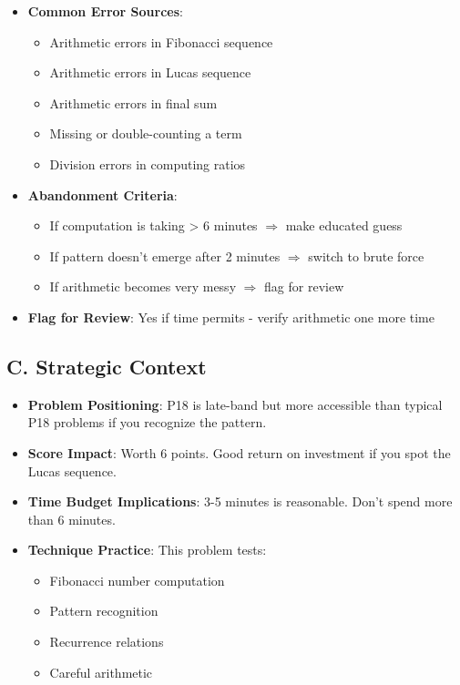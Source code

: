 \documentclass[12pt]{article}
\begin{document}
\begin{competitionbox}
\begin{itemize}[leftmargin=*]
    \item \textbf{Common Error Sources}:
    \begin{itemize}
        \item Arithmetic errors in Fibonacci sequence
        \item Arithmetic errors in Lucas sequence
        \item Arithmetic errors in final sum
        \item Missing or double-counting a term
        \item Division errors in computing ratios
    \end{itemize}
    
    \item \textbf{Abandonment Criteria}: 
    \begin{itemize}
        \item If computation is taking > 6 minutes $\Rightarrow$ make educated guess
        \item If pattern doesn't emerge after 2 minutes $\Rightarrow$ switch to brute force
        \item If arithmetic becomes very messy $\Rightarrow$ flag for review
    \end{itemize}
    
    \item \textbf{Flag for Review}: Yes if time permits - verify arithmetic one more time
\end{itemize}

\subsection*{C. Strategic Context}
\begin{itemize}[leftmargin=*]
    \item \textbf{Problem Positioning}: P18 is late-band but more accessible than typical P18 problems if you recognize the pattern.
    
    \item \textbf{Score Impact}: Worth 6 points. Good return on investment if you spot the Lucas sequence.
    
    \item \textbf{Time Budget Implications}: 3-5 minutes is reasonable. Don't spend more than 6 minutes.
    
    \item \textbf{Technique Practice}: This problem tests:
    \begin{itemize}
        \item Fibonacci number computation
        \item Pattern recognition
        \item Recurrence relations
        \item Careful arithmetic
    \end{itemize}
\end{itemize}
\end{competitionbox}
\end{document}
